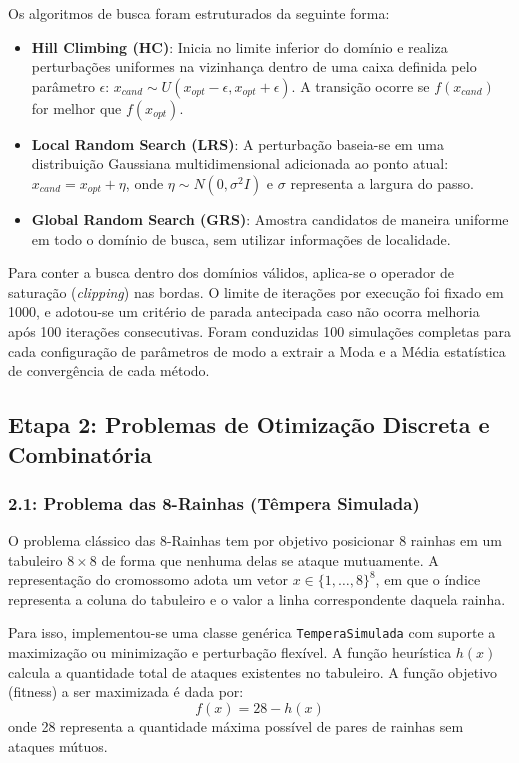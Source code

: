 \documentclass[journal,onecolumn]{IEEEtran}
\begin{document}
Os algoritmos de busca foram estruturados da seguinte forma:
\begin{itemize}
    \item \textbf{Hill Climbing (HC)}: Inicia no limite inferior do domínio e realiza perturbações uniformes na vizinhança dentro de uma caixa definida pelo parâmetro $\epsilon$: $x_{cand} \sim U(x_{opt} - \epsilon, x_{opt} + \epsilon)$. A transição ocorre se $f(x_{cand})$ for melhor que $f(x_{opt})$.
    \item \textbf{Local Random Search (LRS)}: A perturbação baseia-se em uma distribuição Gaussiana multidimensional adicionada ao ponto atual: $x_{cand} = x_{opt} + \eta$, onde $\eta \sim N(0, \sigma^2 I)$ e $\sigma$ representa a largura do passo.
    \item \textbf{Global Random Search (GRS)}: Amostra candidatos de maneira uniforme em todo o domínio de busca, sem utilizar informações de localidade.
\end{itemize}

Para conter a busca dentro dos domínios válidos, aplica-se o operador de saturação (\textit{clipping}) nas bordas. O limite de iterações por execução foi fixado em 1000, e adotou-se um critério de parada antecipada caso não ocorra melhoria após 100 iterações consecutivas. Foram conduzidas 100 simulações completas para cada configuração de parâmetros de modo a extrair a Moda e a Média estatística de convergência de cada método.

\subsection{Etapa 2: Problemas de Otimização Discreta e Combinatória}

\subsubsection{2.1: Problema das 8-Rainhas (Têmpera Simulada)}
O problema clássico das 8-Rainhas tem por objetivo posicionar 8 rainhas em um tabuleiro $8\times8$ de forma que nenhuma delas se ataque mutuamente. A representação do cromossomo adota um vetor $x \in \{1,\dots,8\}^8$, em que o índice representa a coluna do tabuleiro e o valor a linha correspondente daquela rainha.

Para isso, implementou-se uma classe genérica \texttt{TemperaSimulada} com suporte a maximização ou minimização e perturbação flexível. A função heurística $h(x)$ calcula a quantidade total de ataques existentes no tabuleiro. A função objetivo (fitness) a ser maximizada é dada por:
\begin{equation}
f(x) = 28 - h(x)
\end{equation}
onde 28 representa a quantidade máxima possível de pares de rainhas sem ataques mútuos.
\end{document}
